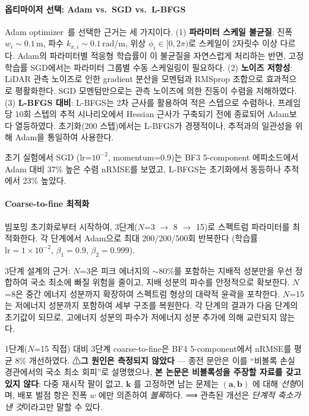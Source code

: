 \documentclass[11pt]{report}
\numberwithin{equation}{chapter}
\numberwithin{figure}{chapter}
\numberwithin{table}{chapter}
\begin{document}
\paragraph{옵티마이저 선택: Adam vs.\ SGD vs.\ L-BFGS}
Adam optimizer~\citep{Kingma2015}를 선택한 근거는 세 가지이다.
(1) \textbf{파라미터 스케일 불균질}: 진폭 $w_i \sim 0.1$\,m, 파수 $k_{x,i} \sim 0.1$\,rad/m,
위상 $\phi_i \in [0, 2\pi)$로 스케일이 2자릿수 이상 다르다.
Adam의 파라미터별 적응형 학습률이 이 불균질을 자연스럽게 처리하는 반면,
고정 학습률 SGD에서는 파라미터 그룹별 수동 스케일링이 필요하다.
(2) \textbf{노이즈 저항성}: LiDAR 관측 노이즈로 인한 gradient 분산을
모멘텀과 RMSprop 조합으로 효과적으로 평활화한다.
SGD 모멘텀만으로는 관측 노이즈에 의한 진동이 수렴을 저해하였다.
(3) \textbf{L-BFGS 대비}: L-BFGS는 2차 근사를 활용하여 적은 스텝으로 수렴하나,
프레임당 10회 스텝의 추적 시나리오에서 Hessian 근사가 구축되기 전에
종료되어 Adam보다 열등하였다. 초기화(200 스텝)에서는 L-BFGS가 경쟁적이나,
추적과의 일관성을 위해 Adam을 통일하여 사용한다.

초기 실험에서 SGD (lr=$10^{-2}$, momentum=0.9)는 BF3 5-component 에피소드에서
Adam 대비 37\% 높은 수렴 nRMSE를 보였고,
L-BFGS는 초기화에서 동등하나 추적에서 23\% 높았다.

\paragraph{Coarse-to-fine 최적화}
빔포밍 초기화로부터 시작하여, 3단계($N$=3 $\to$ 8 $\to$ 15)로
스펙트럼 파라미터를 최적화한다.
각 단계에서 Adam으로 최대 200/200/500회 반복한다
(학습률 $\text{lr} = 1 \times 10^{-2}$, $\beta_1 = 0.9$, $\beta_2 = 0.999$).

3단계 설계의 근거:
$N$=3은 피크 에너지의 $\sim$80\%를 포함하는 지배적 성분만을 우선 정합하여
국소 최소에 빠질 위험을 줄이고, 지배 성분의 파수를 안정적으로 확보한다.
$N$=8은 중간 에너지 성분까지 확장하여 스펙트럼 형상의 대략적 윤곽을 포착한다.
$N$=15는 저에너지 성분까지 포함하여 세부 구조를 복원한다.
각 단계의 결과가 다음 단계의 초기값이 되므로,
고에너지 성분의 파수가 저에너지 성분 추가에 의해 교란되지 않는다.

1단계($N$=15 직접) 대비 3단계 coarse-to-fine은
BF4 5-component에서 nRMSE를 평균 8\% 개선하였다.
⚠\textbf{그 원인은 측정되지 않았다} --- 종전 문안은 이를 ``비볼록 손실 경관에서의
국소 최소 회피''로 설명했으나, \textbf{본 논문은 비볼록성을 주장할 자료를 갖고 있지 않다}:
다중 재시작 팔이 없고, $\mathbf{k}$ 를 고정하면 남는 문제는 $(\mathbf{a},\mathbf{b})$ 에
대해 \emph{선형}이며, 배포 벌점 항은 진폭 $w$ 에만 의존하여 \emph{볼록}하다.
⟹ 관측된 개선은 \emph{단계적 축소가 낸 것}이라고만 말할 수 있다.
\end{document}
